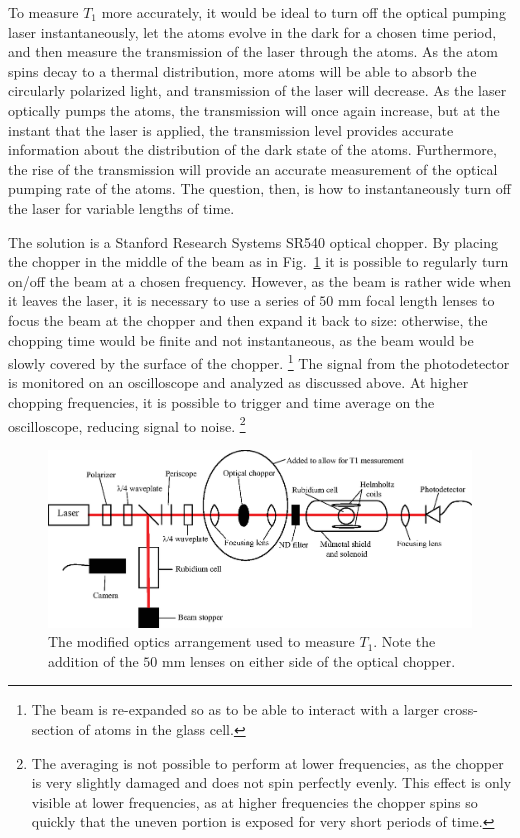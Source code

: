 To measure $T_{1}$ more accurately, it would be ideal to turn off the optical pumping laser instantaneously, let the atoms evolve in the dark for a chosen time period, and then measure the transmission of the laser through the atoms. As the atom spins decay to a thermal distribution, more atoms will be able to absorb the circularly polarized light, and transmission of the laser will decrease. As the laser optically pumps the atoms, the transmission will once again increase, but at the instant that the laser is applied, the transmission level provides accurate information about the distribution of the dark state of the atoms. Furthermore, the rise of the transmission will provide an accurate measurement of the optical pumping rate of the atoms. The question, then, is how to instantaneously turn off the laser for variable lengths of time.

The solution is a Stanford Research Systems SR540 optical chopper. By placing the chopper in the middle of the beam as in Fig.~\ref{fig:optics2} it is possible to regularly turn on/off the beam at a chosen frequency. However, as the beam is rather wide when it leaves the laser, it is necessary to use a series of $50$ mm focal length lenses to focus the beam at the chopper and then expand it back to size: otherwise, the chopping time would be finite and not instantaneous, as the beam would be slowly covered by the surface of the chopper. \footnote{The beam is re-expanded so as to be able to interact with a larger cross-section of atoms in the glass cell.} The signal from the photodetector is monitored on an oscilloscope and analyzed as discussed above. At higher chopping frequencies, it is possible to trigger and time average on the oscilloscope, reducing signal to noise. \footnote{The averaging is not possible to perform at lower frequencies, as the chopper is very slightly damaged and does not spin perfectly evenly. This effect is only visible at lower frequencies, as at higher frequencies the chopper spins so quickly that the uneven portion is exposed for very short periods of time.}


\begin{figure}[htbp]
\begin{center}
\includegraphics[width=6.5in]{./figures/optics2.eps}
\caption{\small{The modified optics arrangement used to measure $T_{1}$. Note the addition of the $50$ mm lenses on either side of the optical chopper.}}
\label{fig:optics2}
\end{center}
\end{figure}


